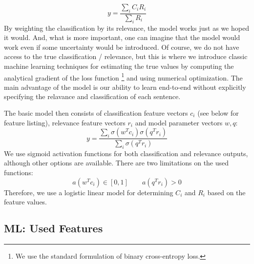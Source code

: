 \documentclass[11pt,a4paper]{article}
\begin{document}
\[ y  = \dfrac{\sum_i C_iR_i}{\sum_i R_i}
\]
By weighting the classification by its relevance, the model works just as we hoped it would.
And, what is more important, one can imagine that the model would work even if some uncertainty would be introduced.
Of course, we do not have access to the true classification / relevance,
but this is where we introduce classic machine learning techniques for estimating the true values by computing the analytical gradient of the loss function%
\footnote{We use the standard formulation of binary cross-entropy loss.}
and using numerical optimization.
The main advantage of the model is our ability to learn end-to-end without explicitly specifying the relavance and classification of each sentence.

The basic model then consists of classification feature vectors $c_i$ (see below for feature listing), relevance feature vectors $r_i$ and model parameter vectors $w, q$:
\[ y  = \dfrac{\sum_i \sigma(w^Tc_i)\sigma(q^Tr_i)}{\sum_i \sigma(q^Tr_i)}
\]
We use sigmoid activation functions for both classification and relevance outputs, although other options are available. There are two limitations on the used functions:
$$a(w^Tc_i) \in  [0,1] \qquad a(q^Tr_i) > 0$$
Therefore, we use a logistic linear model for determining $C_i$ and $R_i$ based on the feature values.

\subsection{ML: Used Features}
\end{document}
